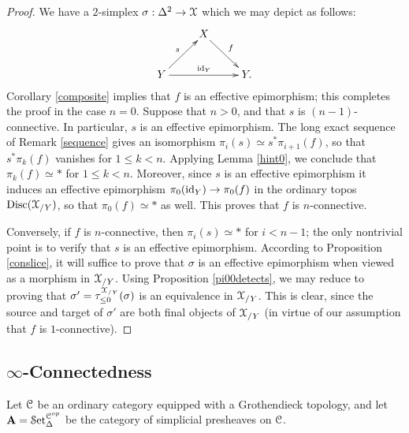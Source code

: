 \begin{proof}
We have a $2$-simplex $\sigma: \Delta^2 \rightarrow \operatorname{\mathcal{X}}$ which we may depict as follows:
$$ \xymatrix{ & X \ar[dr]^{f} & \\
Y \ar[ur]^{s} \ar[rr]^{\id_Y} & & Y. }$$
Corollary \ref{composite} implies that $f$ is an effective epimorphism; this completes the proof in the case $n = 0$. Suppose that $n > 0$, and that $s$ is $(n-1)$-connective.
In particular, $s$ is an effective epimorphism. The long exact sequence of Remark \ref{sequence} gives an isomorphism $\pi_{i}(s) \simeq s^{\ast} \pi_{i+1}(f)$, so that $s^{\ast} \pi_k(f)$ vanishes for
$1 \leq k < n$. Applying Lemma \ref{hint0}, we conclude that $\pi_k(f) \simeq \ast$ for $1 \leq k < n$. Moreover, since $s$ is an effective epimorphism it induces an effective epimorphism
$\pi_0( \operatorname{id}_{Y} ) \rightarrow \pi_0(f)$ in the ordinary topos $\operatorname{Disc}( \operatorname{\mathcal{X}}_{/Y} )$, so that
$\pi_0(f) \simeq \ast$ as well. This proves that $f$ is $n$-connective.

Conversely, if $f$ is $n$-connective, then $\pi_i(s) \simeq \ast$ for
$i < n-1$; the only nontrivial point is to verify that $s$ is an effective epimorphism. According to Proposition \ref{conslice}, it will suffice to prove that $\sigma$ is an effective epimorphism when viewed as a morphism in $\operatorname{\mathcal{X}}_{/Y}$. Using Proposition \ref{pi00detects}, we may reduce to proving that $\sigma' = \tau_{\leq 0}^{\operatorname{\mathcal{X}}_{/Y}}(\sigma)$ is an equivalence in $\operatorname{\mathcal{X}}_{/Y}$.
This is clear, since the source and target of $\sigma'$ are both final objects of $\operatorname{\mathcal{X}}_{/Y}$ (in virtue of our assumption that $f$ is $1$-connective).
\end{proof}

\subsection{$\infty$-Connectedness}\label{hyperstacks}

Let $\operatorname{\mathcal{C}}$ be an ordinary category equipped with a Grothendieck topology, and let
${\mathbf A} = \operatorname{\mathcal{S}et}_{\Delta}^{\operatorname{\mathcal{C}}^{op}}$ be the category of simplicial presheaves on $\operatorname{\mathcal{C}}$.

